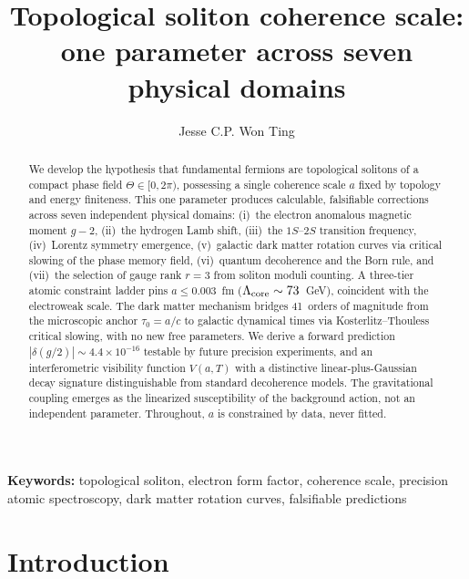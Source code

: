 ﻿\documentclass[a4paper,12pt]{article}
\begin{document}
\title{Topological soliton coherence scale:\\
  one parameter across seven physical domains}

\author{Jesse C.P. Won Ting}



\begin{abstract}
We develop the hypothesis that fundamental fermions are topological
solitons of a compact phase field $\Theta\in[0,2\pi)$, possessing a
single coherence scale $a$ fixed by topology and energy finiteness.
This one parameter produces calculable, falsifiable corrections across
seven independent physical domains: (i)~the electron anomalous magnetic
moment $g{-}2$, (ii)~the hydrogen Lamb shift, (iii)~the $1S$--$2S$
transition frequency, (iv)~Lorentz symmetry emergence, (v)~galactic
dark matter rotation curves via critical slowing of the phase memory
field, (vi)~quantum decoherence and the Born rule, and (vii)~the
selection of gauge rank $r=3$ from soliton moduli counting.  A
three-tier atomic constraint ladder pins $a\leq 0.003$~fm
($\Lambda_{\rm core}\sim 73$~GeV), coincident with the electroweak
scale.  The dark matter mechanism bridges 41~orders of magnitude from
the microscopic anchor $\tau_0 = a/c$ to galactic dynamical times via
Kosterlitz--Thouless critical slowing, with no new free parameters.
We derive a forward prediction $|\delta(g/2)|\sim 4.4\times 10^{-16}$
testable by future precision experiments, and an interferometric
visibility function $V(a,T)$ with a distinctive linear-plus-Gaussian
decay signature distinguishable from standard decoherence models.
The gravitational coupling emerges as the linearized susceptibility
of the background action, not an independent parameter.  Throughout,
$a$ is constrained by data, never fitted.
\end{abstract}

\maketitle

\noindent\textbf{Keywords:} topological soliton, electron form factor, coherence scale, precision atomic spectroscopy, dark matter rotation curves, falsifiable predictions



\section{Introduction}
\label{sec:intro}
\end{document}
